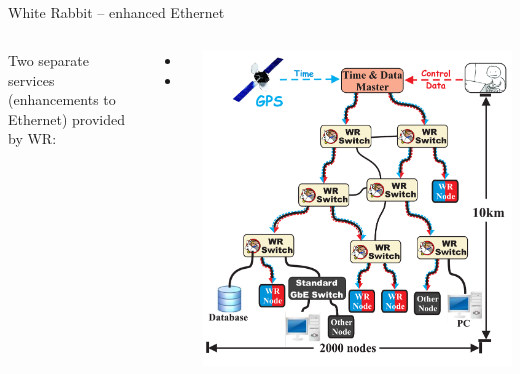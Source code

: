 \documentclass[compress,red]{beamer}
\begin{document}
\subsection{}
\begin{frame}{White Rabbit -- enhanced Ethernet}


\begin{columns}[c]
 
  Two separate services (enhancements to Ethernet) provided by WR: 
  \begin{itemize}
    \item \color{blue!90}{High accuracy/precision synchronization}
    \item \color{red}{Deterministic, reliable and low-latency Control Data delivery}
  \end{itemize}

    \begin{center}
    \includegraphics[width=1.0\textwidth]{network/wr_network-enhanced.pdf}
    \end{center}
\end{columns}

\end{frame}
\end{document}
